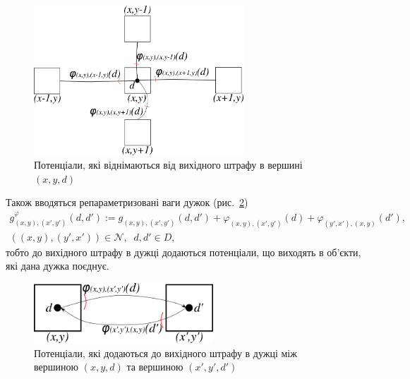 \begin{figure}[h]
  \centering
  \includegraphics[width=0.7\textwidth]{images/reparametrized_vertex_weight}
  \caption{Потенціали, які віднімаються від вихідного штрафу в вершині $\left(x, y, d \right)$}
  \label{fig:reparametrized:vertex:weight}
\end{figure}

Також вводяться репараметризовані ваги дужок (рис.~\ref{fig:reparametrized:edge:weight})
\begin{equation} \label{reparametrized:edge}
\begin{gathered}
    g_{\left(x, y \right), \left(x', y' \right)}^{\varphi} \left(d, d' \right)
    := g_{\left(x, y \right), \left(x', y' \right)} \left(d, d' \right)
    + \varphi_{\left(x, y \right), \left(x', y' \right)} \left(d \right)
    + \varphi_{\left(y', x' \right), \left(x, y \right)} \left(d' \right), \\
    \left(
        \left(x, y \right), \left(y', x' \right)
    \right) \in \mathcal{N}, \; \;
    d, d' \in D,
\end{gathered}
\end{equation}
тобто до вихідного штрафу в дужці додаються потенціали, що виходять в об'єкти,
які дана дужка поєднує.

\begin{figure}[h]
  \centering
  \includegraphics[width=0.6\textwidth]{images/reparametrized_edge_weight}
  \caption{Потенціали, які додаються до вихідного штрафу в дужці між вершиною
           $\left(x, y, d \right)$ та вершиною $\left(x', y', d' \right)$}
  \label{fig:reparametrized:edge:weight}
\end{figure}

